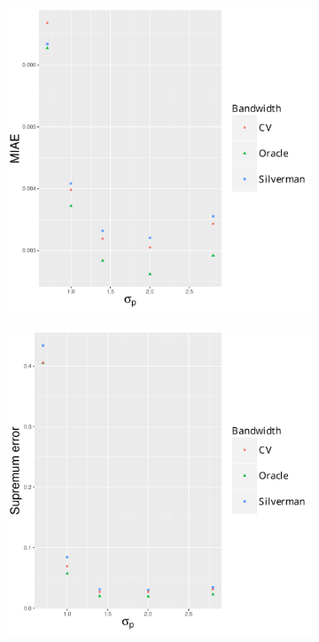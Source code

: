 \begin{figure}[htbp]
    \centering
    \begin{subfigure}[t]{0.24\textwidth}
        \includegraphics[width=\textwidth]{results/by_population_spread/MIAE-vs-population-spread}
        \caption{}
        \label{fig:other_measures:pSD_100_1h:miae}
    \end{subfigure}
    \begin{subfigure}[t]{0.24\textwidth}
        \includegraphics[width=\textwidth]{results/by_population_spread/maxerr-vs-population-spread}

\end{subfigure}
\end{figure}
